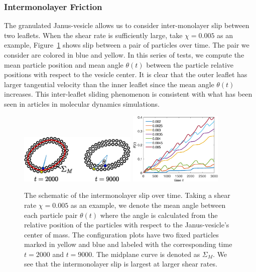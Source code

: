 \documentclass[lineno]{jfm}
\begin{document}
\subsubsection{Intermonolayer Friction}
The granulated Janus-vesicle allows us to consider inter-monolayer slip
between two leaflets. When the shear rate is sufficiently large, take
$\chi = 0.005$ as an example, Figure~\ref{figure5} shows slip between a
pair of particles over time. The pair we consider are colored in blue
and yellow. In this series of tests, we compute the mean particle
position and mean angle $\theta(t)$ between the particle relative
positions with respect to the vesicle center. It is clear that the outer
leaflet has larger tangential velocity than the inner leaflet since the
mean angle $\theta(t)$ increases. This inter-leaflet sliding phenomenon
is consistent with what has been seen in articles in molecular dynamics
simulations.

%


\begin{figure}
\begin{center}
\includegraphics[width=0.5\textwidth]{Slip.eps}
\includegraphics[width=0.4\textwidth]{Slip2.eps}
\end{center} 
  \caption{\label{figure5} The schematic of the intermonolayer slip over
  time. Taking a shear rate $\chi=0.005$ as an example, we denote the
  mean angle between each particle pair $\theta(t)$ where the angle is
  calculated from the relative position of the particles with respect to
  the Janus-vesicle's center of mass. The configuration plots have two
  fixed particles marked in yellow and blue and labeled with the
  corresponding time $t=2000$ and $t=9000$. The midplane curve is
  denoted as $\Sigma_M$. We see that the intermonolayer slip is largest
  at larger shear rates.}
\end{figure}
\end{document}
